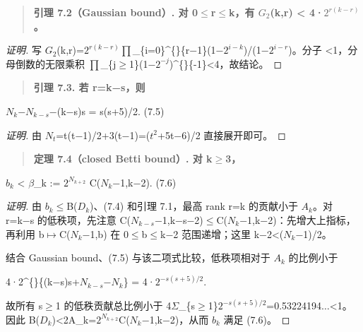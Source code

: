 \documentclass[11pt]{ctexart}
\begin{document}
\begin{quote}\textbf{引理 7.2（Gaussian bound）. 对 0\ensuremath{\le}r\ensuremath{\le}k，有 \ensuremath{G_2}(k,r) < 4·\ensuremath{2^{r(k−r)}}。}\end{quote}

\begin{proof}[证明] 

写 \ensuremath{G_2}(k,r)=\ensuremath{2^{r(k−r)}}\ensuremath{\prod}\_\{i=0\}\textasciicircum\{\}\{r−1\}(1−\ensuremath{2^{i−k}})/(1−\ensuremath{2^{i−r}})。分子 <1，分母倒数的无限乘积 \ensuremath{\prod}\_\{j\ensuremath{\ge}1\}(1−\ensuremath{2^{-j}})\textasciicircum\{\}\{-1\}<4，故结论。

\end{proof}

\begin{quote}\textbf{引理 7.3. 若 r=k−s，则}\end{quote}

\ensuremath{N_{k}}−\ensuremath{N_{k−s}}−(k−s)s = s(s+5)/2.    (7.5)

\begin{proof}[证明] 

由 \ensuremath{N_{t}}=t(t−1)/2+3(t−1)=(\ensuremath{t^2}+5t−6)/2 直接展开即可。

\end{proof}

\begin{quote}\textbf{定理 7.4（closed Betti bound）. 对 k\ensuremath{\ge}3，}\end{quote}

\ensuremath{b_{k}} < \ensuremath{\beta}\_k := \ensuremath{2^{N_{k+2}}} C(\ensuremath{N_{k}}−1,k−2).    (7.6)

\begin{proof}[证明] 

由 \ensuremath{b_{k}}\ensuremath{\le}B(\ensuremath{D_{k}})、(7.4) 和引理 7.1，最高 rank r=k 的贡献小于 \ensuremath{A_{k}}。对 r=k−s 的低秩项，先注意 C(\ensuremath{N_{k−s}}−1,k−s−2)\ensuremath{\le}C(\ensuremath{N_{k}}−1,k−2)：先增大上指标，再利用 b\ensuremath{\mapsto}C(\ensuremath{N_{k}}−1,b) 在 0\ensuremath{\le}b\ensuremath{\le}k−2 范围递增；这里 k−2<(\ensuremath{N_{k}}−1)/2。

结合 Gaussian bound、(7.5) 与该二项式比较，低秩项相对于 \ensuremath{A_{k}} 的比例小于

4·2\textasciicircum\{\}\{(k−s)s+\ensuremath{N_{k−s}}−\ensuremath{N_{k}}\} = 4·\ensuremath{2^{−s(s+5)/2}}.

故所有 s\ensuremath{\ge}1 的低秩贡献总比例小于 4\ensuremath{\Sigma}\_\{s\ensuremath{\ge}1\}\ensuremath{2^{−s(s+5)/2}}=0.53224194\ensuremath{\ldots}<1。因此 B(\ensuremath{D_{k}})<2A\_k=\ensuremath{2^{N_{k+2}}}C(\ensuremath{N_{k}}−1,k−2)，从而 \ensuremath{b_{k}} 满足 (7.6)。

\end{proof}
\end{document}
